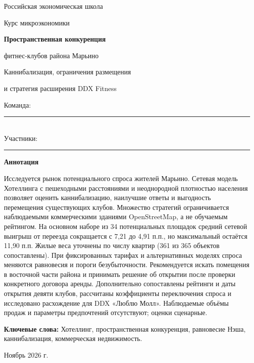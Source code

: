 \documentclass[12pt,a4paper]{article}
\begin{document}
\begin{titlepage}
\thispagestyle{empty}
\begin{center}
{\large Российская экономическая школа\par}
{\large Курс микроэкономики\par}
\vspace{2cm}
{\LARGE\bfseries Пространственная конкуренция\par фитнес-клубов района Марьино\par}
\vspace{.5cm}
{\large Каннибализация, ограничения размещения\par и стратегия расширения DDX Fitness\par}
\vspace{1.4cm}
\end{center}
\noindent Команда: \rule{.72\linewidth}{.4pt}\\[8pt]
Участники: \rule{.67\linewidth}{.4pt}
\vspace{1cm}
\begin{center}\textbf{Аннотация}\end{center}
Исследуется рынок потенциального спроса жителей Марьино. Сетевая модель Хотеллинга с пешеходными расстояниями и неоднородной плотностью населения позволяет оценить каннибализацию, наилучшие ответы и выгодность перемещения существующих клубов. Множество стратегий ограничивается наблюдаемыми коммерческими зданиями OpenStreetMap, а не обучаемым рейтингом. На основном наборе из 34 потенциальных площадок средний сетевой выигрыш от переезда сокращается с 7,21 до 4,91 п.п., но максимальный остаётся 11,90 п.п. Жилые веса уточнены по числу квартир (361 из 365 объектов сопоставлены). При фиксированных тарифах и альтернативных моделях спроса меняются равновесия и пороги безубыточности. Рекомендуется искать помещения в восточной части района и принимать решение об открытии после проверки конкретного договора аренды. Дополнительно сопоставлены рейтинги и даты открытия девяти клубов, рассчитаны коэффициенты переключения спроса и исследовано расхождение для DDX «Люблю Молл». Наблюдаемые объёмы продаж и параметры предпочтений отсутствуют; оценки сценарные.
\par\medskip\noindent\textbf{Ключевые слова:} Хотеллинг, пространственная конкуренция, равновесие Нэша, каннибализация, коммерческая недвижимость.
\vfill\begin{center}Ноябрь 2026 г.\end{center}
\end{titlepage}
\tableofcontents
\clearpage
\end{document}
